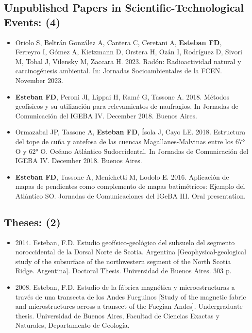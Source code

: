 \documentclass[11pt, a4paper]{article}
\begin{document}
\subsection{Unpublished Papers in Scientific-Technological Events: (4)}

\begin{itemize}
  \item Oriolo S, Beltrán González A, Cantera C, Ceretani A, \textbf{Esteban FD}, Ferreyro I, Gómez A, Kietzmann D, Orstera H, Ozán I, Rodríguez D, Sivori M, Tobal J, Vilensky M, Zaccara H. 2023. Radón: Radioactividad natural y carcinogénesis ambiental. In: Jornadas Socioambientales de la FCEN. November 2023.

  \item \textbf{Esteban FD}, Peroni JI, Lippai H, Ramé G, Tassone A. 2018. Métodos geofísicos y su utilización para relevamientos de naufragios. In Jornadas de Comunicación del IGEBA IV. December 2018. Buenos Aires.

  \item Ormazabal JP, Tassone A, \textbf{Esteban FD}, Ísola J, Cayo LE. 2018. Estructura del tope de cuña y antefosa de las cuencas Magallanes-Malvinas entre los 67° O y 62° O. Océano Atlántico Sudoccidental. In Jornadas de Comunicación del IGEBA IV. December 2018. Buenos Aires.

  \item \textbf{Esteban FD}, Tassone A, Menichetti M, Lodolo E. 2016. Aplicación de mapas de pendientes como complemento de mapas batimétricos: Ejemplo del Atlántico SO. Jornadas de Comunicaciones del IGeBA III. Oral presentation.
\end{itemize}

\subsection{Theses: (2)}

\begin{itemize}
  \item 2014. Esteban, F.D. Estudio geofísico-geológico del subsuelo del segmento noroccidental de la Dorsal Norte de Scotia. Argentina [Geophysical-geological study of the subsurface of the northwestern segment of the North Scotia Ridge. Argentina]. Doctoral Thesis. Universidad de Buenos Aires. 303 p.
  \item 2008. Esteban, F.D. Estudio de la fábrica magnética y microestructuras a través de una transecta de los Andes Fueguinos [Study of the magnetic fabric and microstructures across a transect of the Fuegian Andes]. Undergraduate thesis. Universidad de Buenos Aires, Facultad de Ciencias Exactas y Naturales, Departamento de Geología.
\end{itemize}
\end{document}
